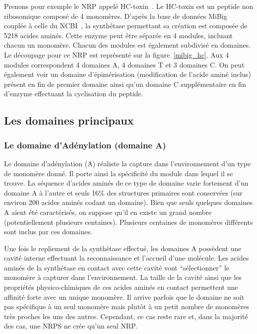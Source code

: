 Prenons pour exemple le NRP appelé HC-toxin~\cite{_mibig:_????}.
Le HC-toxin est un peptide non ribosomique composé de 4 monomères.
D'après la base de données MiBig~\cite{medema_minimum_2015} couplée à celle du NCBI~\cite{ncbi_resource_coordinators_database_2013}, la synthétase permettant sa création est composée de 5218 acides aminés.
Cette enzyme peut être séparée en 4 modules, incluant chacun un monomère.
Chacun des modules est également subdivisé en domaines.
Le découpage pour ce NRP est représenté sur la figure~\ref{mibig_hc}.
Aux 4 modules correspondent 4 domaines A, 4 domaines T et 3 domaines C.
On peut également voir un domaine d'épimérisation (modification de l'acide aminé inclus) présent en fin de premier domaine ainsi qu'un domaine C supplémentaire en fin d'enzyme effectuant la cyclisation du peptide.

\subsection{Les domaines principaux}

\subsubsection{Le domaine d'Adénylation (domaine A)}

Le domaine d'adénylation (A) réaliste la capture dans l'environnement d'un type de monomère donné.
Il porte ainsi la spécificité du module dans lequel il se trouve.
La séquence d'acides aminés de ce type de domaine varie fortement d'un domaine A à l'autre et seuls 16\% des structures primaires sont conservées (sur environ 200 acides aminés codant un domaine).
Bien que seuls quelques domaines A aient été caractérisés, on suppose qu'il en existe un grand nombre (potentiellement plusieurs centaines).
Plusieurs centaines de monomères différents sont inclus par ces domaines.

Une fois le repliement de la synthétase effectué, les domaines A possèdent une cavité interne effectuant la reconnaissance et l'accueil d'une molécule.
Les acides aminés de la synthétase en contact avec cette cavité vont ``sélectionner'' le monomère à capturer dans l'environnement.
La taille de la cavité ainsi que les propriétés physico-chimiques de ces acides aminés en contact permettent une affinité forte avec un unique monomère.
Il arrive parfois que le domaine ne soit pas spécifique à un seul monomère mais plutôt à un petit nombre de monomères très proches les uns des autres.
Cependant, ce cas reste rare et, dans la majorité des cas, une NRPS ne crée qu'un seul NRP.

